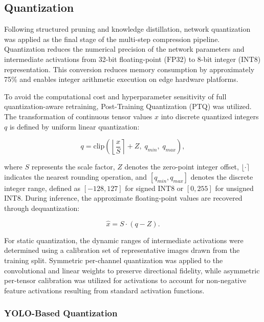 \subsection{Quantization}

Following structured pruning and knowledge distillation, network quantization was applied as the final stage of the multi-step compression pipeline. Quantization reduces the numerical precision of the network parameters and intermediate activations from 32-bit floating-point ($\text{FP32}$) to 8-bit integer ($\text{INT8}$) representation. This conversion reduces memory consumption by approximately 75\% and enables integer arithmetic execution on edge hardware platforms.

To avoid the computational cost and hyperparameter sensitivity of full quantization\allowbreak -aware retraining, Post-Training Quantization (PTQ) was utilized. The transformation of continuous tensor values $x$ into discrete quantized integers $q$ is defined by uniform linear quantization:

$$
q = \text{clip}\left(\left\lfloor \frac{x}{S} \right\rceil + Z, \; q_{min}, \; q_{max}\right),
$$

where $S$ represents the scale factor, $Z$ denotes the zero-point integer offset, $\lfloor \cdot \rceil$ indicates the nearest rounding operation, and $[q_{min}, q_{max}]$ denotes the discrete integer range, defined as $[-128, 127]$ for signed $\text{INT8}$ or $[0, 255]$ for unsigned $\text{INT8}$. During inference, the approximate floating-point values are recovered through dequantization:

$$
\hat{x} = S \cdot (q - Z).
$$

For static quantization, the dynamic ranges of intermediate activations were determined using a calibration set of representative images drawn from the training split. Symmetric per-channel quantization was applied to the convolutional and linear weights to preserve directional fidelity, while asymmetric per-tensor calibration was utilized for activations to account for non-negative feature activations resulting from standard activation functions.

\subsubsection{YOLO-Based Quantization}


